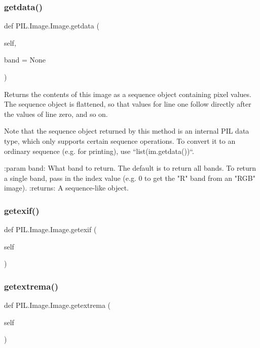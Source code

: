 \subsubsection{\texorpdfstring{getdata()}{getdata()}}
{\footnotesize\ttfamily def P\+I\+L.\+Image.\+Image.\+getdata (\begin{DoxyParamCaption}\item[{}]{self,  }\item[{}]{band = {\ttfamily None} }\end{DoxyParamCaption})}

\begin{DoxyVerb}Returns the contents of this image as a sequence object
containing pixel values.  The sequence object is flattened, so
that values for line one follow directly after the values of
line zero, and so on.

Note that the sequence object returned by this method is an
internal PIL data type, which only supports certain sequence
operations.  To convert it to an ordinary sequence (e.g. for
printing), use ``list(im.getdata())``.

:param band: What band to return.  The default is to return
   all bands.  To return a single band, pass in the index
   value (e.g. 0 to get the "R" band from an "RGB" image).
:returns: A sequence-like object.
\end{DoxyVerb}
 \mbox{\label{classPIL_1_1Image_1_1Image_aa8672dd3a153fd33a39d9fb0ef3a62f0}} 
\subsubsection{\texorpdfstring{getexif()}{getexif()}}
{\footnotesize\ttfamily def P\+I\+L.\+Image.\+Image.\+getexif (\begin{DoxyParamCaption}\item[{}]{self }\end{DoxyParamCaption})}

\mbox{\label{classPIL_1_1Image_1_1Image_ab5b97c380d1d058084386c1ffc2f095a}} 
\subsubsection{\texorpdfstring{getextrema()}{getextrema()}}
{\footnotesize\ttfamily def P\+I\+L.\+Image.\+Image.\+getextrema (\begin{DoxyParamCaption}\item[{}]{self }\end{DoxyParamCaption})}


